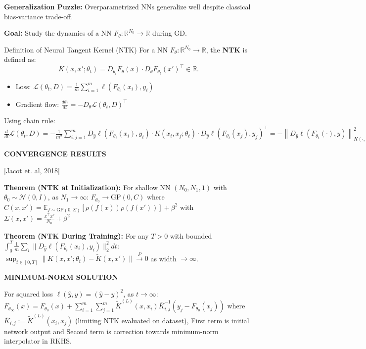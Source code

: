 \documentclass[a4paper,10pt]{article}
\newenvironment{myitemize}
{\vspace{-0.25cm}\begin{itemize}}
{\end{itemize}}
\def\R{\mathbb{R}}
\newcommand{\subtitle}[1]{\vspace{0.25cm}\begin{normalsize}\textbf{\textcolor{gray!150}{\uppercase{#1}}}\end{normalsize}}
\begin{document}
\begin{small}
\textbf{Generalization Puzzle:} Overparametrized NNs generalize well despite classical bias-variance trade-off.

\textbf{Goal:} Study the dynamics of a NN $F_\theta : \R^{N_0} \to \R$ during GD.

\begin{subbox}{Definition of Neural Tangent Kernel (NTK)}
For a NN \( F_{\theta} : \mathbb{R}^{N_0} \rightarrow \mathbb{R} \), the \textbf{NTK} is defined as:
\[
K(x, x'; \theta_t) = D_{\theta_t} F_{\theta}(x) \cdot D_{\theta} F_{\theta_t}(x')^\top \in \mathbb{R}.
\]
\end{subbox}

\begin{myitemize}
    \item Loss: $\mathcal{L}(\theta_t, D) = \frac{1}{m} \sum_{i=1}^m \ell(F_{\theta_t}(x_i), y_i)$
    \item Gradient flow: $\frac{d\theta_t}{dt} = - D_\theta \mathcal{L}(\theta_t, D)^\top$
\end{myitemize}

Using chain rule:
$\frac{d}{dt} \mathcal{L}(\theta_t, D) = - \frac{1}{m^2} \sum_{i,j=1}^m D_{\hat{y}} \ell(F_{\theta_t}(x_i), y_i) \cdot K(x_i, x_j; \theta_t) \cdot D_{\hat{y}} \ell(F_{\theta_t}(x_j), y_j)^\top 
= - \left\| D_{\hat{y}} \ell(F_{\theta_t}(\cdot), y) \right\|_{K(\cdot, \cdot, \theta_t), D}^2$


\subtitle{Convergence Results} [Jacot et. al, 2018]

\textbf{Theorem (NTK at Initialization):} For shallow NN $(N_0,N_1,1)$ with $\theta_0 \sim \mathcal{N}(0,I)$, as $N_1 \to \infty$:
$F_{\theta_0} \to \text{GP}(0,C)$ where
$C(x,x') = \mathbb{E}_{f \sim \text{GP}(0,\Sigma)}[\rho(f(x))\rho(f(x'))] + \beta^2$
with $\Sigma(x,x') = \frac{x^\top x'}{N_0} + \beta^2$

\textbf{Theorem (NTK During Training):} For any $T>0$ with bounded $\int_0^T \frac{1}{m}\sum_i \|D_{\hat{y}}\ell(F_{\theta_t}(x_i),y_i)\|_2^2dt$:
$\sup_{t\in[0,T]}\|K(x,x';\theta_t) - \tilde{K}(x,x')\| \xrightarrow{P} 0$ as width $\to \infty$.   

\subtitle{Minimum-Norm Solution}

For squared loss $\ell(\hat{y},y) = (\hat{y}-y)^2$, as $t \to \infty$:
$F_{\theta_\infty}(x) = F_{\theta_0}(x) + \sum_{i=1}^m \sum_{j=1}^m \tilde{K}^{(L)}(x,x_i)\bar{K}_{i,j}^{-1}(y_j - F_{\theta_0}(x_j))$
where $\bar{K}_{i,j} := \tilde{K}^{(L)}(x_i,x_j)$ (limiting NTK evaluated on dataset), First term is initial network output
and Second term is correction towards minimum-norm interpolator in RKHS.


\end{small}
\end{document}
